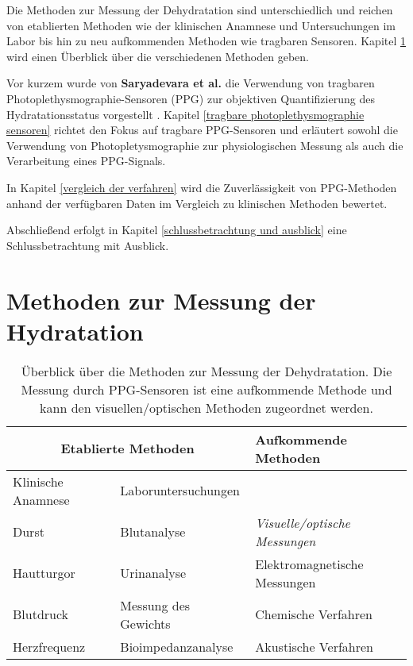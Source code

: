 \documentclass[10pt,a4paper,headinclude,twoside, plainheadsepline, open=right, numbers=noenddot, twocolumn]{article}
\begin{document}
Die Methoden zur Messung der Dehydratation sind unterschiedlich und reichen von etablierten Methoden wie der klinischen Anamnese und Untersuchungen im Labor bis hin zu neu aufkommenden Methoden wie tragbaren Sensoren.
Kapitel \ref{methoden zur messung der hydratation} wird einen Überblick über die verschiedenen Methoden geben. 

Vor kurzem wurde von \textbf{Saryadevara et al.} die Verwendung von tragbaren Photoplethysmographie-Sensoren (PPG) zur objektiven Quantifizierung des Hydratationsstatus vorgestellt \cite{suryadevara2015towards}.
Kapitel \ref{tragbare photoplethysmographie sensoren} richtet den Fokus auf tragbare PPG-Sensoren und erläutert sowohl die Verwendung von Photopletysmographie zur physiologischen Messung als auch die Verarbeitung eines PPG-Signals.

In Kapitel \ref{vergleich der verfahren} wird die Zuverlässigkeit von PPG-Methoden anhand der verfügbaren Daten im Vergleich zu klinischen Methoden bewertet.

Abschließend erfolgt in Kapitel \ref{schlussbetrachtung und ausblick} eine Schlussbetrachtung mit Ausblick. 



\section{Methoden zur Messung der Hydratation}
\label{methoden zur messung der hydratation}

\begin{table*}[ht]
\centering
\begin{tabular*}{15cm}{p{4.5cm}p{4.5cm}p{5cm}}
\toprule
\multicolumn{2}{c}{\textbf{Etablierte Methoden}} & \multicolumn{1}{l}{\textbf{Aufkommende Methoden}} \\
 \midrule
Klinische Anamnese & Laboruntersuchungen & \\
\cmidrule(r){1-1}\cmidrule(lr){2-2}
Durst & Blutanalyse  & \textit{Visuelle/optische Messungen} \\
Hautturgor & Urinanalyse & Elektromagnetische Messungen \\
Blutdruck & Messung des Gewichts & Chemische Verfahren \\
Herzfrequenz & Bioimpedanzanalyse & Akustische Verfahren \\
\bottomrule
\end{tabular*}
\caption{Überblick über die Methoden zur Messung der Dehydratation. Die Messung durch PPG-Sensoren ist eine aufkommende Methode und kann den visuellen/optischen Methoden zugeordnet werden.}
\label{methodenübersicht}
\end{table*}
\end{document}
